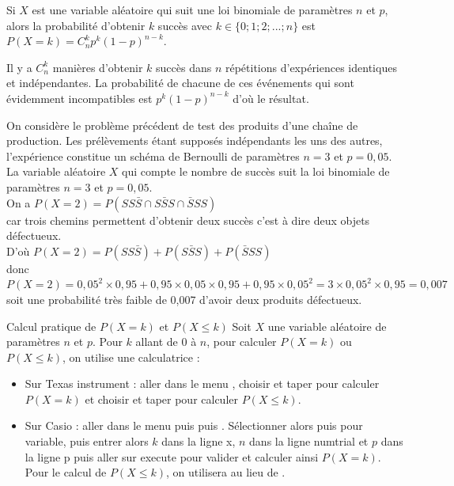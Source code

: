 \documentclass[french]{book}
\newcommand{\C}[2]{C_{#1}^{#2}}
\begin{document}
\begin{prop}
 Si $X$ est une variable aléatoire qui suit une loi binomiale de paramètres $n$ et $p$, alors la probabilité d'obtenir $k$ succès avec $k\in\{0;1;2;...;n\}$ est $P(X=k)=\C{n}{k}p^k(1-p)^{n-k}$.
\end{prop}


\begin{demo}
Il y a $\C{n}{k}$ manières d'obtenir $k$ succès dans $n$ répétitions d'expériences identiques et indépendantes. La probabilité de chacune de ces événements qui sont évidemment incompatibles est $p^k(1-p)^{n-k}$ d'où le résultat.
\end{demo} 

\begin{exemple}
On considère le problème précédent de test des produits d'une chaîne de production. Les prélèvements étant supposés indépendants les uns des autres, l'expérience constitue un schéma de Bernoulli de paramètres $n=3$ et $p=0,05$. La variable aléatoire $X$ qui compte le nombre de succès suit la loi binomiale de paramètres $n=3$ et $p=0,05$.\\
On a $P(X=2)=P(SS\bar{S}\cap S\bar{S}S\cap \bar{S}SS)$\\
 car trois chemins permettent d'obtenir deux succès c'est à dire deux objets défectueux.\\
D'où $P(X=2)=P(SS\bar{S})+P(S\bar{S}S)+P(\bar{S}SS)$\\
donc $P(X=2)=0,05^2\times 0,95+0,95\times 0,05\times 0,95+0,95\times 0,05^2=3\times 0,05^2\times 0,95=0,007$\\
soit une probabilité très faible de 0,007 d'avoir deux produits défectueux.
\end{exemple}

\begin{rem}{Calcul pratique de $P(X=k)$ et $P(X\leq k)$}
Soit $X$ une variable aléatoire de paramètres $n$ et $p$. Pour $k$ allant de 0 à $n$, pour calculer $P(X=k)$ ou $P(X\leq k)$, on utilise une calculatrice :
\begin{itemize}
\item[$\bullet$] Sur Texas instrument : aller dans le menu , choisir  et taper \fbox{,}\fbox{,}\fbox{)} pour calculer $P(X=k)$ et choisir  et taper \fbox{,}\fbox{,}\fbox{)} pour calculer $P(X\leq k)$.
\item[$\bullet$] Sur Casio : aller dans le menu  puis  puis . Sélectionner alors  puis  pour variable, puis entrer alors $k$  dans la ligne \og{}x\fg{}, $n$ dans la ligne \og{}numtrial\fg{} et $p$ dans la ligne \og{}p\fg{} puis aller sur \og{}execute\fg{} pour valider et calculer ainsi $P(X=k)$. Pour le calcul de  $P(X\leq k)$, on utilisera  au lieu de .
\end{itemize}
\end{rem}
\end{document}
